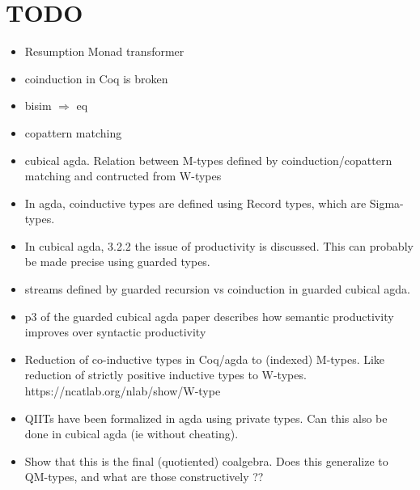 \documentclass[twoside,11pt,openright]{report}
\begin{document}
\section{TODO}
\begin{itemize}
\item Resumption Monad transformer
\item coinduction in Coq is broken
\item bisim \(\Rightarrow\) eq
\item copattern matching
\item cubical agda. Relation between M-types defined by coinduction/copattern matching and contructed from W-types
\item   In agda, coinductive types are defined using Record types, which are Sigma-types. 
\item   In cubical agda, 3.2.2 the issue of productivity is discussed. This can probably be made precise using guarded types.
\item streams defined by guarded recursion vs coinduction in guarded cubical agda. 
\item    p3 of the guarded cubical agda paper describes how semantic productivity improves over syntactic productivity
\item Reduction of co-inductive types in Coq/agda to (indexed) M-types. Like reduction of strictly positive inductive types to W-types. https://ncatlab.org/nlab/show/W-type
\item QIITs have been formalized in agda using private types. Can this also be done in cubical agda (ie without cheating).
\item   Show that this is the final (quotiented) coalgebra. Does this generalize to QM-types, and what are those constructively ??
\end{itemize}

\end{document}
